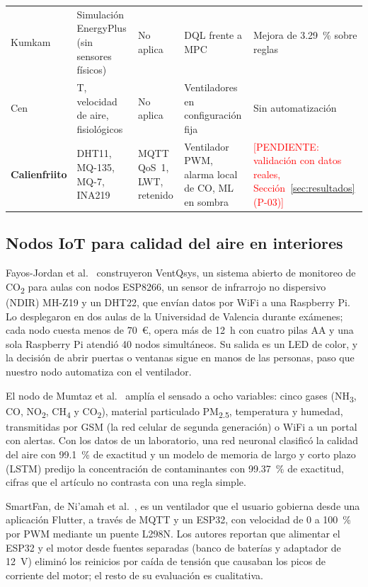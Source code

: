 \documentclass[manuscript,screen,nonacm,natbib=false]{acmart}
\newcommand{\pendiente}[1]{\textcolor{red}{[PENDIENTE: #1]}}
\newcommand{\COdos}{CO\textsubscript{2}}
\begin{document}
\begin{table}[htbp]
\begin{tabularx}{\linewidth}{@{}P{2.1cm} Y P{2.3cm} Y Y@{}}
Kumkam~\cite{kumkam2025comparative} & Simulación EnergyPlus (sin sensores físicos) & No aplica & DQL frente a MPC & Mejora de 3.29~\% sobre reglas \\
Cen~\cite{cen2024students} & T, velocidad de aire, fisiológicos & No aplica & Ventiladores en configuración fija & Sin automatización \\
\midrule
\textbf{Calienfriito} & DHT11, MQ-135, MQ-7, INA219 & MQTT QoS~1, LWT, retenido & Ventilador PWM, alarma local de CO, ML en sombra & \pendiente{validación con datos reales, Sección~\ref{sec:resultados} (P-03)} \\
\bottomrule
\end{tabularx}
\end{table}

\subsection{Nodos IoT para calidad del aire en interiores}
Fayos-Jordan et al.~\cite{fayos2021ventqsys} construyeron VentQsys, un sistema abierto de monitoreo de \COdos{} para aulas con nodos ESP8266, un sensor de infrarrojo no dispersivo (NDIR) MH-Z19 y un DHT22, que envían datos por WiFi a una Raspberry Pi. Lo desplegaron en dos aulas de la Universidad de Valencia durante exámenes; cada nodo cuesta menos de 70~€, opera más de 12~h con cuatro pilas AA y una sola Raspberry Pi atendió 40 nodos simultáneos. Su salida es un LED de color, y la decisión de abrir puertas o ventanas sigue en manos de las personas, paso que nuestro nodo automatiza con el ventilador.

El nodo de Mumtaz et al.~\cite{mumtaz2021iot} amplía el sensado a ocho variables: cinco gases (NH\textsubscript{3}, CO, NO\textsubscript{2}, CH\textsubscript{4} y \COdos{}), material particulado PM\textsubscript{2.5}, temperatura y humedad, transmitidas por GSM (la red celular de segunda generación) o WiFi a un portal con alertas. Con los datos de un laboratorio, una red neuronal clasificó la calidad del aire con 99.1~\% de exactitud y un modelo de memoria de largo y corto plazo (LSTM) predijo la concentración de contaminantes con 99.37~\% de exactitud, cifras que el artículo no contrasta con una regla simple.

SmartFan, de Ni'amah et al.~\cite{niamah2026esp32}, es un ventilador que el usuario gobierna desde una aplicación Flutter, a través de MQTT y un ESP32, con velocidad de 0 a 100~\% por PWM mediante un puente L298N. Los autores reportan que alimentar el ESP32 y el motor desde fuentes separadas (banco de baterías y adaptador de 12~V) eliminó los reinicios por caída de tensión que causaban los picos de corriente del motor; el resto de su evaluación es cualitativa.
\end{document}
